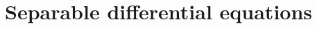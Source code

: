 \section{Separable differential equations} \label{S:7.4.Separable}



\newpage



\newpage



\newpage



\newpage

\clearpage
